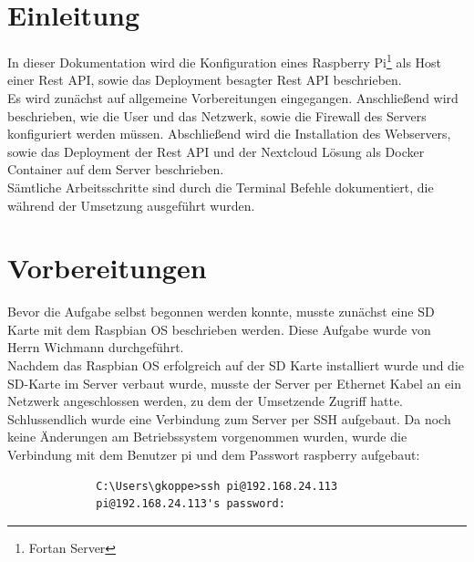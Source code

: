 \documentclass[a4paper, 12pt]{scrartcl}
\begin{document}
\newpage
\thispagestyle{empty}
\tableofcontents
\newpage
\clearpage
{}


\section{Einleitung}
In dieser Dokumentation wird die Konfiguration eines Raspberry Pi\footnote{Fortan \glqq Server\grqq} als Host einer Rest API, sowie das Deployment besagter Rest API beschrieben.
\\
Es wird zunächst auf allgemeine Vorbereitungen eingegangen. Anschließend wird beschrieben, wie die User und das Netzwerk, sowie die Firewall des Servers konfiguriert werden müssen.
Abschließend wird die Installation des Webservers, sowie das Deployment der Rest API und der Nextcloud Lösung als Docker Container auf dem Server beschrieben.
\\
Sämtliche Arbeitsschritte sind durch die Terminal Befehle dokumentiert, die während der Umsetzung ausgeführt wurden.



\section{Vorbereitungen}
Bevor die Aufgabe selbst begonnen werden konnte, musste zunächst eine SD Karte mit dem Raspbian OS beschrieben werden. Diese Aufgabe wurde von Herrn Wichmann durchgeführt.
\\
Nachdem das Raspbian OS erfolgreich auf der SD Karte installiert wurde und die SD-Karte im Server verbaut wurde, musste der Server per Ethernet Kabel an ein Netzwerk
angeschlossen werden, zu dem der Umsetzende Zugriff hatte.
\\
Schlussendlich wurde eine Verbindung zum Server per SSH aufgebaut. Da noch keine Änderungen am Betriebssystem vorgenommen wurden, wurde die Verbindung mit dem Benutzer
\glqq pi\grqq{} und dem Passwort \grqq raspberry\grqq{} aufgebaut:
\begin{figure}[H]
    \begin{mdframed}[backgroundcolor=bbg]
        \begin{lstlisting}
        C:\Users\gkoppe>ssh pi@192.168.24.113
        pi@192.168.24.113's password:
        \end{lstlisting}
    \end{mdframed}
    \label{lst:user_72}
\end{figure}
\end{document}
